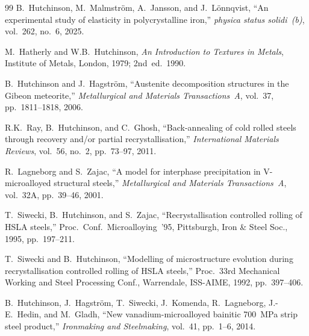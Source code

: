 \documentclass[11pt,a4paper]{article}
\begin{document}
\begin{thebibliography}{99}
B.~Hutchinson, M.~Malmstr\"om, A.~Jansson, and J.~L\"onnqvist,
``An experimental study of elasticity in polycrystalline iron,''
\emph{physica status solidi~(b)}, vol.~262, no.~6, 2025.

M.~Hatherly and W.B.~Hutchinson,
\emph{An Introduction to Textures in Metals},
Institute of Metals, London, 1979; 2nd~ed.\ 1990.

B.~Hutchinson and J.~Hagstr\"om,
``Austenite decomposition structures in the Gibeon meteorite,''
\emph{Metallurgical and Materials Transactions~A}, vol.~37,
pp.~1811--1818, 2006.

R.K.~Ray, B.~Hutchinson, and C.~Ghosh,
``Back-annealing of cold rolled steels through recovery and/or partial
recrystallisation,''
\emph{International Materials Reviews}, vol.~56, no.~2, pp.~73--97, 2011.

R.~Lagneborg and S.~Zajac,
``A model for interphase precipitation in V-microalloyed structural steels,''
\emph{Metallurgical and Materials Transactions~A}, vol.~32A, pp.~39--46,
2001.

T.~Siwecki, B.~Hutchinson, and S.~Zajac,
``Recrystallisation controlled rolling of HSLA steels,''
Proc.\ Conf.\ Microalloying~'95, Pittsburgh, Iron \& Steel Soc., 1995,
pp.~197--211.

T.~Siwecki and B.~Hutchinson,
``Modelling of microstructure evolution during recrystallisation
controlled rolling of HSLA steels,''
Proc.\ 33rd Mechanical Working and Steel Processing Conf., Warrendale,
ISS-AIME, 1992, pp.~397--406.

B.~Hutchinson, J.~Hagstr\"om, T.~Siwecki, J.~Komenda, R.~Lagneborg,
J.-E.~Hedin, and M.~Gladh,
``New vanadium-microalloyed bainitic 700~MPa strip steel product,''
\emph{Ironmaking and Steelmaking}, vol.~41, pp.~1--6, 2014.

\end{thebibliography}
\end{document}
